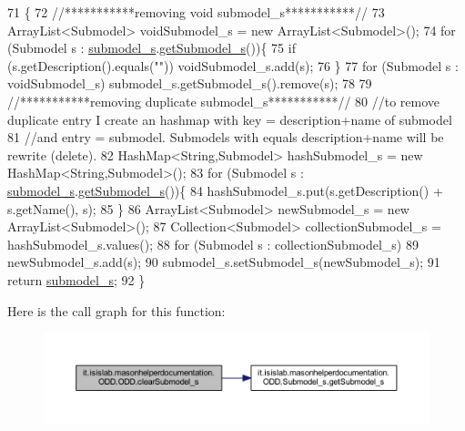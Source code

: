 \begin{DoxyCode}
71                                                 \{
72         \textcolor{comment}{//***********removing void submodel\_s***********//}
73         ArrayList<Submodel> voidSubmodel\_s = \textcolor{keyword}{new} ArrayList<Submodel>();
74         \textcolor{keywordflow}{for} (Submodel s : \hyperlink{classit_1_1isislab_1_1masonhelperdocumentation_1_1_o_d_d_1_1_o_d_d_a1da5e6dcf76e4a83ec91831f5ab98bf2}{submodel\_s}.\hyperlink{classit_1_1isislab_1_1masonhelperdocumentation_1_1_o_d_d_1_1_submodel__s_afe2141a5dacaecbbfc44a3d4d10a9d37}{getSubmodel\_s}())\{
75             \textcolor{keywordflow}{if} (s.getDescription().equals(\textcolor{stringliteral}{""}))  voidSubmodel\_s.add(s);
76         \}
77         \textcolor{keywordflow}{for} (Submodel s : voidSubmodel\_s)   submodel\_s.getSubmodel\_s().\textcolor{keyword}{remove}(s);
78         
79         \textcolor{comment}{//***********removing duplicate submodel\_s***********//}
80         \textcolor{comment}{//to remove duplicate entry I create an hashmap with key = description+name of submodel}
81         \textcolor{comment}{//and entry = submodel. Submodels with equals description+name will be rewrite (delete).}
82         HashMap<String,Submodel> hashSubmodel\_s = \textcolor{keyword}{new} HashMap<String,Submodel>();
83         \textcolor{keywordflow}{for} (Submodel s : \hyperlink{classit_1_1isislab_1_1masonhelperdocumentation_1_1_o_d_d_1_1_o_d_d_a1da5e6dcf76e4a83ec91831f5ab98bf2}{submodel\_s}.\hyperlink{classit_1_1isislab_1_1masonhelperdocumentation_1_1_o_d_d_1_1_submodel__s_afe2141a5dacaecbbfc44a3d4d10a9d37}{getSubmodel\_s}())\{
84             hashSubmodel\_s.put(s.getDescription() + s.getName(), s);
85         \}
86         ArrayList<Submodel> newSubmodel\_s = \textcolor{keyword}{new} ArrayList<Submodel>();
87         Collection<Submodel> collectionSubmodel\_s = hashSubmodel\_s.values();
88         \textcolor{keywordflow}{for} (Submodel s : collectionSubmodel\_s)
89             newSubmodel\_s.add(s);
90         submodel\_s.setSubmodel\_s(newSubmodel\_s);
91         \textcolor{keywordflow}{return} \hyperlink{classit_1_1isislab_1_1masonhelperdocumentation_1_1_o_d_d_1_1_o_d_d_a1da5e6dcf76e4a83ec91831f5ab98bf2}{submodel\_s};
92     \}
\end{DoxyCode}


Here is the call graph for this function\-:\nopagebreak
\begin{figure}[H]
\begin{center}
\leavevmode
\includegraphics[width=350pt]{classit_1_1isislab_1_1masonhelperdocumentation_1_1_o_d_d_1_1_o_d_d_a967fd254c4e555432b7dba443855922e_cgraph}
\end{center}
\end{figure}




